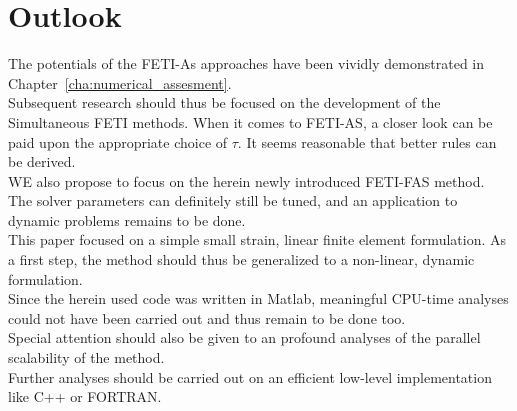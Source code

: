 \chapter{Outlook}

The potentials of the FETI-As approaches have been vividly demonstrated in Chapter~\ref{cha:numerical_assesment}.\\
Subsequent research should thus be focused on the development of the Simultaneous FETI  methods. When it comes to FETI-AS, a closer look can be paid upon the appropriate choice of $\tau$. It seems reasonable that better rules can be derived.\\
WE also propose to focus on the herein newly introduced FETI-FAS method. The solver parameters can definitely still be tuned, and an application to dynamic problems remains to be done.\\
This paper focused on a simple small strain, linear finite element formulation. As a first step, the method should thus be generalized to a non-linear, dynamic formulation.\\
Since the herein used code was written in Matlab, meaningful CPU-time analyses could not have been carried out and thus remain to be done too.\\
Special attention should also be given to an profound analyses of the parallel scalability of the method.\\
Further analyses should be carried out on an efficient low-level implementation like C++ or FORTRAN.